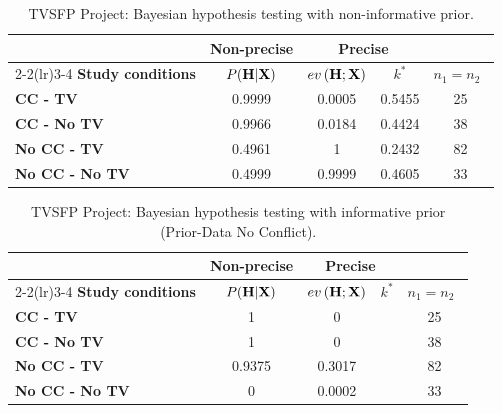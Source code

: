 \documentclass[AMA,Times1COL]{WileyNJDv5} %
\newcommand{\bX}{\boldsymbol{\mathrm{X}}}
\begin{document}
\begin{center}
\begin{table}[!h]%
\caption{TVSFP Project: Bayesian hypothesis testing with non-informative prior.}\label{tab2}%
\begin{tabular*}{\textwidth}{@{\extracolsep\fill}lcccc@{}}
\toprule
&\multicolumn{1}{c}{\textbf{Non-precise}} & \multicolumn{2}{c}{\textbf{Precise}} \\\cmidrule(lr){2-2}\cmidrule(lr){3-4}
\textbf{Study conditions} & $P(\text{\textbf{H}}\vert \bX)$   & $ev\left(\text{\textbf{H}};\bX\right)$  & $k^*$& $n_1=n_2$\   \\
\midrule
\textbf{CC - TV} & 0.9999 & 0.0005&0.5455& 25  \\ 
\textbf{CC - No TV} & 0.9966 & 0.0184& 0.4424&38 \\ 
 \textbf{No CC - TV} & 0.4961 & 1& 0.2432&82 \\ 
   \textbf{No CC - No TV} & 0.4999 & 0.9999& 0.4605&33\\ 
\bottomrule
\end{tabular*}
\end{table}
\end{center}

\begin{center}
\begin{table}[!h]%
\caption{TVSFP Project: Bayesian hypothesis testing with informative prior (Prior-Data No Conflict).}\label{tab3}%
\begin{tabular*}{\textwidth}{@{\extracolsep\fill}lcccc@{}}
\toprule
&\multicolumn{1}{c}{\textbf{Non-precise}} & \multicolumn{2}{c}{\textbf{Precise}} \\\cmidrule(lr){2-2}\cmidrule(lr){3-4}
\textbf{Study conditions} & $P(\text{\textbf{H}}\vert \bX)$   & $ev\left(\text{\textbf{H}};\bX\right)$  & $k^*$& $n_1=n_2$\   \\
\midrule
\textbf{CC - TV} & 1 & 0&& 25  \\ 
 \textbf{CC - No TV} & 1&0 & &38 \\ 
 \textbf{No CC - TV} & 0.9375 & 0.3017& &82 \\ 
  \textbf{No CC - No TV} & 0 & 0.0002& &33\\ 
\bottomrule
\end{tabular*}
\end{table}
\end{center}
\end{document}
